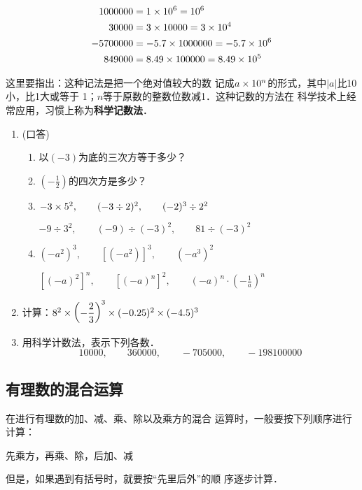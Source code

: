 \begin{solution}
\[\begin{split}
    1000000 &=1\times 10^6=10^6\\ 
    30000  &=3\times 10000=3\times 10^4\\
    -5700000 &=-5.7\times 1000000=-5.7\times 10^6\\
     849000    &=8.49\times 100000=8.49\times 10^5
\end{split}\]
\end{solution}

这里要指出：这种记法是把一个绝对值较大的数
记成$a\times10^n$的形式，其中$|a|$比10小，比1大或等于
1；$n$等于原数的整数位数减1．这种记数的方法在
科学技术上经常应用，习惯上称为\textbf{科学记数法}．


\begin{ex}
\begin{enumerate}
    \item (口答)
     \begin{enumerate}
         \item 以$(- 3)$为底的三次方等于多少？
         \item $\left(-\frac{1}{2}\right)$的四次方是多少？
         \item $-3\times 5^2,\qquad (-3\div 2)^2,\qquad (-2)^3\div 2^2$
         
$-9\div 3^2,\qquad (-9)\div (-3)^2,\qquad 81\div (-3)^2$
 \item $(-a^2)^3,\qquad [(-a^2)]^3,\qquad (-a^3)^2$
 
 $[(-a)^2]^n,\qquad [(-a)^n]^2,\qquad (-a)^n\cdot \left(-\frac{1}{a}\right)^n$
      \end{enumerate}   
\item 计算：$8^2\times \left(-\dfrac{2}{3}\right)^3\times(-0.25)^2\times (-4.5)^3$
\item 用科学计数法，表示下列各数．
\[10000,\qquad 360000,\qquad -705000,\qquad -198100000  \]
\end{enumerate}
\end{ex}

\subsection{有理数的混合运算}
    在进行有理数的加、减、乘、除以及乘方的混合
运算时，一般要按下列顺序进行计算：
\begin{center}
  先乘方，再乘、除，后加、减  
\end{center}
但是，如果遇到有括号时，就要按“先里后外”的顺
序逐步计算．




